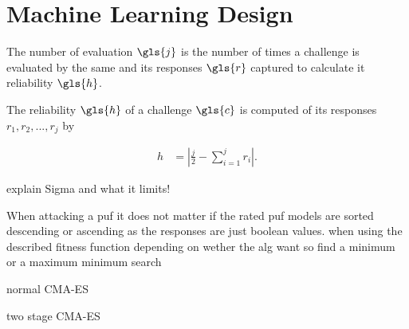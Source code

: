 \section{Machine Learning Design}
\label{sec:machinelearningdesign}

The number of evaluation $\gls{j}$ is the number of times a challenge is evaluated by the same \apuf and its responses $\gls{r}$ captured to calculate it reliability $\gls{h}$.

The reliability $\gls{h}$ of a challenge $\gls{c}$ is computed of its responses $r_1, r_2, ..., r_j$ by

\begin{align}
h &= |\frac{j}{2} - \sum_{i = 1}^{j}r_i|. \label{equ:reliability}
\end{align}


explain Sigma and what it limits!

When attacking a puf it does not matter if the rated puf models are sorted descending or ascending as the responses are just boolean values.
when using the described fitness function
depending on wether the alg want so find a minimum or a maximum
minimum search


normal CMA-ES

two stage CMA-ES

